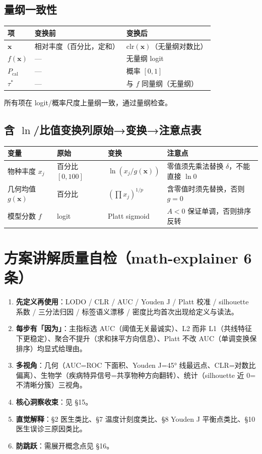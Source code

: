 \documentclass{internal-report}
\begin{document}
\subsection{量纲一致性}

\begin{center}
\begin{tabular}{lll}
\toprule
项 & 变换前 & 变换后 \\
\midrule
$\mathbf{x}$ & 相对丰度（百分比，定和） & $\text{clr}(\mathbf{x})$（无量纲对数比） \\
$f(\mathbf{x})$ & — & 无量纲 logit \\
$P_{\text{cal}}$ & — & 概率 $[0,1]$ \\
$\tau^{*}$ & — & 与 $f$ 同量纲（无量纲） \\
\bottomrule
\end{tabular}
\end{center}

所有项在 logit/概率尺度上量纲一致，通过量纲检查。

\subsection{含 $\ln$/比值变换列原始→变换→注意点表}

\begin{center}
\begin{tabular}{llll}
\toprule
变量 & 原始 & 变换 & 注意点 \\
\midrule
物种丰度 $x_j$ & 百分比 $[0,100]$ & $\ln(x_j/g(\mathbf{x}))$ & 零值须先乘法替换 $\delta$，不能直接 $\ln 0$ \\
几何均值 $g(\mathbf{x})$ & 百分比 & $\left(\prod x_j\right)^{1/p}$ & 含零值时须先替换，否则 $g=0$ \\
模型分数 $f$ & logit & Platt sigmoid & $A<0$ 保证单调，否则排序反转 \\
\bottomrule
\end{tabular}
\end{center}

\section{方案讲解质量自检（math-explainer 6 条）}

\begin{enumerate}
\item \textbf{先定义再使用}：LODO / CLR / AUC / Youden J / Platt 校准 / silhouette 系数 / 三分法归因 / 标签语义漂移 / 密度比均首次出现给定义与读法。
\item \textbf{每步有「因为」}：主指标选 AUC（阈值无关最诚实）、L2 而非 L1（共线特征下更稳定）、聚合不提升（求和抹平方向信息）、Platt 不改 AUC（单调变换保排序）均显式给理由。
\item \textbf{多视角}：几何（AUC=ROC 下面积、Youden J=45° 线最远点、CLR=对数比偏离）、生物学（疾病特异信号=共享物种方向翻转）、统计（silhouette 近 0=不清晰分簇）三视角。
\item \textbf{核心洞察收束}：见 §15。
\item \textbf{直觉解释}：§2 医生类比、§7 温度计刻度类比、§8 Youden J 平衡点类比、§10 医生误诊三原因类比。
\item \textbf{防跳跃}：需展开概念点见 §16。
\end{enumerate}
\end{document}
